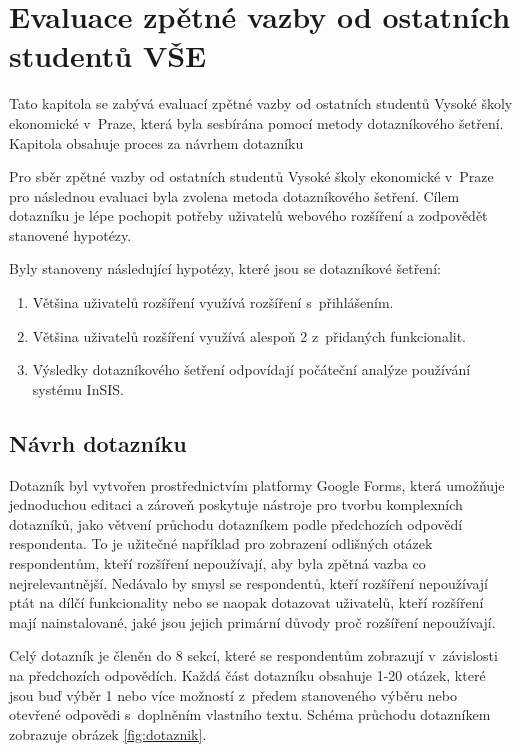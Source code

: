 \chapter{Evaluace zpětné vazby od ostatních studentů VŠE}\label{chap:zpetna-vazba}

Tato kapitola se zabývá evaluací zpětné vazby od ostatních studentů Vysoké školy ekonomické v~Praze, která byla sesbírána pomocí metody dotazníkového šetření. Kapitola obsahuje proces za návrhem dotazníku

Pro sběr zpětné vazby od ostatních studentů Vysoké školy ekonomické v~Praze pro následnou evaluaci byla zvolena metoda dotazníkového šetření. Cílem dotazníku je lépe pochopit potřeby uživatelů webového rozšíření a zodpovědět stanovené hypotézy.

Byly stanoveny následující hypotézy, které jsou se dotazníkové šetření:

\begin{enumerate}
    \item Většina uživatelů rozšíření využívá rozšíření s~přihlášením.
    \item Většina uživatelů rozšíření využívá alespoň 2 z~přidaných funkcionalit.
    \item Výsledky dotazníkového šetření odpovídají počáteční analýze používání systému InSIS.
\end{enumerate}

\section{Návrh dotazníku}

Dotazník byl vytvořen prostřednictvím platformy Google Forms, která umožňuje jednoduchou editaci a zároveň poskytuje nástroje pro tvorbu komplexních dotazníků, jako větvení průchodu dotazníkem podle předchozích odpovědí respondenta. To je užitečné například pro zobrazení odlišných otázek respondentům, kteří rozšíření nepoužívají, aby byla zpětná vazba co nejrelevantnější. Nedávalo by smysl se respondentů, kteří rozšíření nepoužívají ptát na dílčí funkcionality nebo se naopak dotazovat uživatelů, kteří rozšíření mají nainstalované, jaké jsou jejich primární důvody proč rozšíření nepoužívají. 

Celý dotazník je členěn do 8 sekcí, které se respondentům zobrazují v~závislosti na předchozích odpovědích. Každá část dotazníku obsahuje 1-20 otázek, které jsou buď výběr 1 nebo více možností z~předem stanoveného výběru nebo otevřené odpovědi s~doplněním vlastního textu. Schéma průchodu dotazníkem zobrazuje obrázek \ref{fig:dotaznik}.


